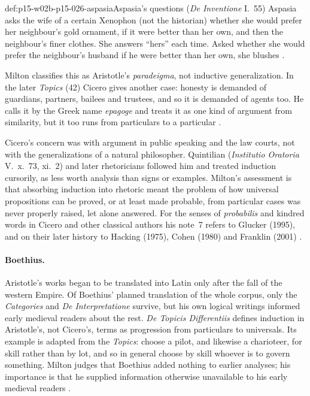 \begin{hbexample}{def:p15-w02b-p15-026-aspasia}{Aspasia's questions (\emph{De Inventione} I.~55)}
Aspasia asks the wife of a certain Xenophon (not the historian) whether
she would prefer her neighbour's gold ornament, if it were better than her
own, and then the neighbour's finer clothes. She answers ``hers'' each
time. Asked whether she would prefer the neighbour's husband if he were
better than her own, she blushes \cite[p.~11]{Milton2011InductionBeforeHume}.

Milton classifies this as Aristotle's \emph{paradeigma}, not inductive
generalization. In the later \emph{Topics} (42) Cicero gives another case:
honesty is demanded of guardians, partners, bailees and trustees, and so
it is demanded of agents too. He calls it by the Greek name \emph{epagoge}
and treats it as one kind of argument from similarity, but it too
runs from particulars to a particular \cite[p.~11]{Milton2011InductionBeforeHume}.
\end{hbexample}

Cicero's concern was with argument in public speaking and the law courts,
not with the generalizations of a natural philosopher. Quintilian
(\emph{Institutio Oratoria} V.~x.~73, xi.~2) and later rhetoricians
followed him and treated induction cursorily, as less worth analysis than
signs or examples. Milton's assessment is that absorbing induction into
rhetoric meant the problem of how universal propositions can be proved,
or at least made probable, from particular cases was never properly
raised, let alone answered. For the senses of \emph{probabilis} and
kindred words in Cicero and other classical authors his note~7 refers to
Glucker (1995), and on their later history to Hacking (1975), Cohen
(1980) and Franklin (2001) \cite[pp.~11--12]{Milton2011InductionBeforeHume}.

\paragraph{Boethius.}
Aristotle's works began to be translated into Latin only after the fall of
the western Empire. Of Boethius' planned translation of the whole corpus,
only the \emph{Categories} and \emph{De Interpretatione} survive, but his
own logical writings informed early medieval readers about the rest.
\emph{De Topicis Differentiis} defines induction in Aristotle's, not
Cicero's, terms as progression from particulars to universals. Its example
is adapted from the \emph{Topics}: choose a pilot, and likewise a
charioteer, for skill rather than by lot, and so in general choose by
skill whoever is to govern something. Milton judges that Boethius added
nothing to earlier analyses; his importance is that he supplied
information otherwise unavailable to his early medieval readers
\cite[p.~12]{Milton2011InductionBeforeHume}.

